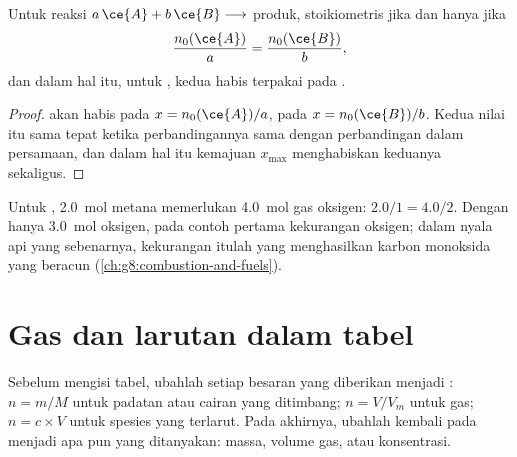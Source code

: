 \begin{proposition}\label{prop:g10:reaction-progress-table:together}
Untuk reaksi $a\,\ce{A} + b\,\ce{B} \longrightarrow$ produk,  stoikiometris jika
dan hanya jika
\[
  \frac{n_0(\ce{A})}{a} = \frac{n_0(\ce{B})}{b},
\]
dan dalam hal itu, untuk , kedua  habis terpakai
pada .
\end{proposition}

\begin{proof}
 akan habis pada $x = n_0(\ce{A})/a$,  pada $x = n_0(\ce{B})/b$.
Kedua nilai itu sama tepat ketika perbandingannya sama dengan
perbandingan dalam persamaan, dan dalam hal itu kemajuan $x_{\max}$
menghabiskan keduanya sekaligus.
\end{proof}

\begin{example}\label{ex:g10:reaction-progress-table:stoich}
Untuk , \qty{2.0}{mol} metana memerlukan
\qty{4.0}{mol} gas oksigen: $2.0/1 = 4.0/2$. Dengan hanya
\qty{3.0}{mol} oksigen,  pada contoh pertama kekurangan oksigen;
dalam nyala api yang sebenarnya, kekurangan itulah yang menghasilkan
karbon monoksida yang beracun (\cref{ch:g8:combustion-and-fuels}).
\end{example}

\section{Gas dan larutan dalam tabel}


\begin{method}\label{met:g10:reaction-progress-table:amounts}
Sebelum mengisi tabel, ubahlah setiap besaran yang diberikan menjadi
: $n = m/M$ untuk padatan atau cairan yang ditimbang;
$n = V/V_m$ untuk gas; $n = c \times V$ untuk spesies yang terlarut. Pada
akhirnya, ubahlah kembali  pada  menjadi apa pun
yang ditanyakan: massa, volume gas, atau konsentrasi.
\end{method}

